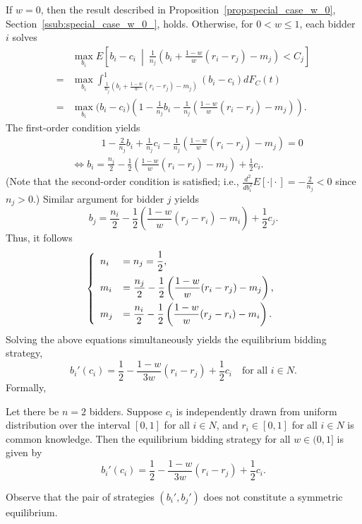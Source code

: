 If $w=0$, then the result described in Proposition~\ref{prop:special_case_w_0}, Section~\ref{ssub:special_case_w_0_}, holds. Otherwise, for $0<w\le 1$, each bidder $i$ solves
\begin{align}
	&\max_{b_i} E \left[ b_i-c_i \:\middle\vert\: \frac{1}{n_j}\left( b_i + \frac{1-w}{w}(r_i-r_j)-m_j \right) < C_j \right] \nonumber\\
	= &\max_{b_i}\int_{\frac{1}{n_j}(b_i + \frac{1-w}{w}(r_i-r_j)-m_j)}^{1} (b_i-c_i)dF_C(t)\nonumber\\
	= &\max_{b_i} \bigg(b_i-c_i\bigg) \left(1-\frac{1}{n_j}b_i-\frac{1}{n_j} \left(\frac{1-w}{w}(r_i-r_j)-m_j \right) \right).
	\label{eq:pcomp_exp_utility_w_1}
\end{align}
The first-order condition yields
\begin{align}
	&\qquad\quad 1 - \frac{2}{n_j}b_i + \frac{1}{n_j}c_i - \frac{1}{n_j}\left( \frac{1-w}{w}(r_i-r_j) - m_j \right) = 0 \nonumber\\
	&\iff b_i = \frac{n_j}{2} - \frac{1}{2}\left( \frac{1-w}{w}(r_i-r_j) - m_j \right) + \frac{1}{2}c_i.
\end{align}
(Note that the second-order condition is satisfied; i.e., $\frac{d^2}{db^2_i}E[\cdot\vert\cdot] = -\frac{2}{n_j} < 0$ since $n_j>0$.) Similar argument for bidder $j$ yields
\begin{equation}
	b_j = \frac{n_i}{2} - \frac{1}{2}\left( \frac{1-w}{w}(r_j-r_i) - m_i \right) + \frac{1}{2}c_j.
\end{equation}
Thus, it follows
\begin{equation*}
	\left\{
	\begin{array}{l l}
		n_i &= n_j = \displaystyle\frac{1}{2},\\[2ex]
		m_i &= \displaystyle\frac{n_j}{2} - \displaystyle\frac{1}{2}\left( \displaystyle\frac{1-w}{w}(r_i-r_j) - m_j \right),\\[2ex]
		m_j &= \displaystyle\frac{n_i}{2} - \displaystyle\frac{1}{2}\left( \displaystyle\frac{1-w}{w}(r_j-r_i) - m_i \right).
	\end{array}\right.
\end{equation*}
Solving the above equations simultaneously yields the equilibrium bidding strategy,
\begin{equation*}
	b_i'(c_i) = \frac{1}{2} - \frac{1-w}{3w}(r_i-r_j) + \frac{1}{2}c_i \quad\text{for all } i\in N.
\end{equation*}
Formally,
\begin{proposition}
\label{prop:pcomp_equi_bidding_str}
Let there be $n=2$ bidders. Suppose $c_i$ is independently drawn from uniform distribution over the interval $[0,1]$ for all $i\in N$, and $r_i\in [0,1]$ for all $i\in N$ is common knowledge. Then the equilibrium bidding strategy for all $w\in (0,1]$ is given by
\begin{equation}
	\label{eq:pcomp_equi_bidding_str}
	b_i'(c_i) = \frac{1}{2} - \frac{1-w}{3w}(r_i-r_j) + \frac{1}{2}c_i.
\end{equation}
\end{proposition}
\noindent Observe that the pair of strategies $(b_i', b_j')$ does not constitute a symmetric equilibrium.

